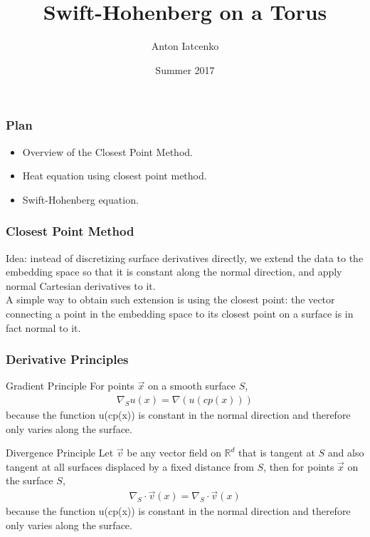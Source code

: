 \documentclass{beamer}
\title{Swift-Hohenberg on a Torus}
\author{Anton Iatcenko}
\date{Summer 2017}
\begin{document}
 
 
 
 
\frame{\titlepage}


 
 
\begin{frame}
\frametitle{Plan} 

\begin{itemize}

\item Overview of the Closest Point Method.

\item Heat equation using closest point method. 

\item Swift-Hohenberg equation.

\end{itemize}

\end{frame}



\begin{frame}
\frametitle{Closest Point Method} 

Idea: instead of discretizing surface derivatives directly, we extend the data to the embedding space so that it is constant
along the normal direction, and apply normal Cartesian derivatives to it.  \\

A simple way to obtain such extension is using the closest point: the vector connecting a point in the embedding space to its
closest point on a surface is in fact normal to it.

\end{frame}

 

 
\begin{frame}
\frametitle{Derivative Principles} 
 
\begin{block}{Gradient Principle}
For points $\vec{x}$ on a smooth surface $S$, 
\begin{gather*}
\nabla_S u(x) = \nabla(u(cp(x)))
\end{gather*}
because the function u(cp(x)) is constant in the normal direction and therefore only varies along the surface. 
\end{block}


\begin{block}{Divergence Principle}
Let $\vec v$ be any vector field on $\mathds{R}^d$ that is tangent at $S$ and also tangent at all surfaces displaced by a 
fixed distance from $S$, then for points $\vec x$ on the surface $S$, \vspace{-5mm}
\begin{gather*}
\nabla_S \cdot \vec v(x) = \nabla_S \cdot \vec v(x)
\end{gather*}
because the function u(cp(x)) is constant in the normal direction and therefore only varies along the surface. 
\end{block}
 
 
\end{frame} 
\end{document}
